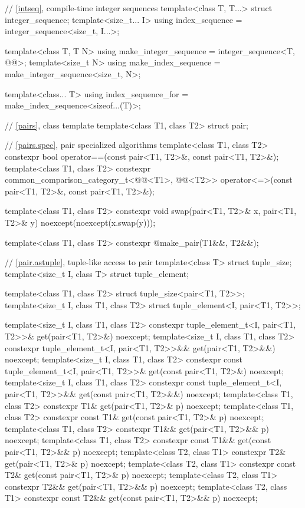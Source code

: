 \begin{codeblock}
{  // \ref{intseq}, compile-time integer sequences%
%
%
  template<class T, T...>
    struct integer_sequence;
  template<size_t... I>
    using index_sequence = integer_sequence<size_t, I...>;

  template<class T, T N>
    using make_integer_sequence = integer_sequence<T, @\seebelow{}@>;
  template<size_t N>
    using make_index_sequence = make_integer_sequence<size_t, N>;

  template<class... T>
    using index_sequence_for = make_index_sequence<sizeof...(T)>;

  // \ref{pairs}, class template 
  template<class T1, class T2>
    struct pair;

  // \ref{pairs.spec}, pair specialized algorithms
  template<class T1, class T2>
    constexpr bool operator==(const pair<T1, T2>&, const pair<T1, T2>&);
  template<class T1, class T2>
    constexpr common_comparison_category_t<@@<T1>,
                                           @@<T2>>
      operator<=>(const pair<T1, T2>&, const pair<T1, T2>&);

  template<class T1, class T2>
    constexpr void swap(pair<T1, T2>& x, pair<T1, T2>& y) noexcept(noexcept(x.swap(y)));

  template<class T1, class T2>
    constexpr @\seebelow@ make_pair(T1&&, T2&&);

  // \ref{pair.astuple}, tuple-like access to pair
  template<class T> struct tuple_size;
  template<size_t I, class T> struct tuple_element;

  template<class T1, class T2> struct tuple_size<pair<T1, T2>>;
  template<size_t I, class T1, class T2> struct tuple_element<I, pair<T1, T2>>;

  template<size_t I, class T1, class T2>
    constexpr tuple_element_t<I, pair<T1, T2>>& get(pair<T1, T2>&) noexcept;
  template<size_t I, class T1, class T2>
    constexpr tuple_element_t<I, pair<T1, T2>>&& get(pair<T1, T2>&&) noexcept;
  template<size_t I, class T1, class T2>
    constexpr const tuple_element_t<I, pair<T1, T2>>& get(const pair<T1, T2>&) noexcept;
  template<size_t I, class T1, class T2>
    constexpr const tuple_element_t<I, pair<T1, T2>>&& get(const pair<T1, T2>&&) noexcept;
  template<class T1, class T2>
    constexpr T1& get(pair<T1, T2>& p) noexcept;
  template<class T1, class T2>
    constexpr const T1& get(const pair<T1, T2>& p) noexcept;
  template<class T1, class T2>
    constexpr T1&& get(pair<T1, T2>&& p) noexcept;
  template<class T1, class T2>
    constexpr const T1&& get(const pair<T1, T2>&& p) noexcept;
  template<class T2, class T1>
    constexpr T2& get(pair<T1, T2>& p) noexcept;
  template<class T2, class T1>
    constexpr const T2& get(const pair<T1, T2>& p) noexcept;
  template<class T2, class T1>
    constexpr T2&& get(pair<T1, T2>&& p) noexcept;
  template<class T2, class T1>
    constexpr const T2&& get(const pair<T1, T2>&& p) noexcept;

}
\end{codeblock}
